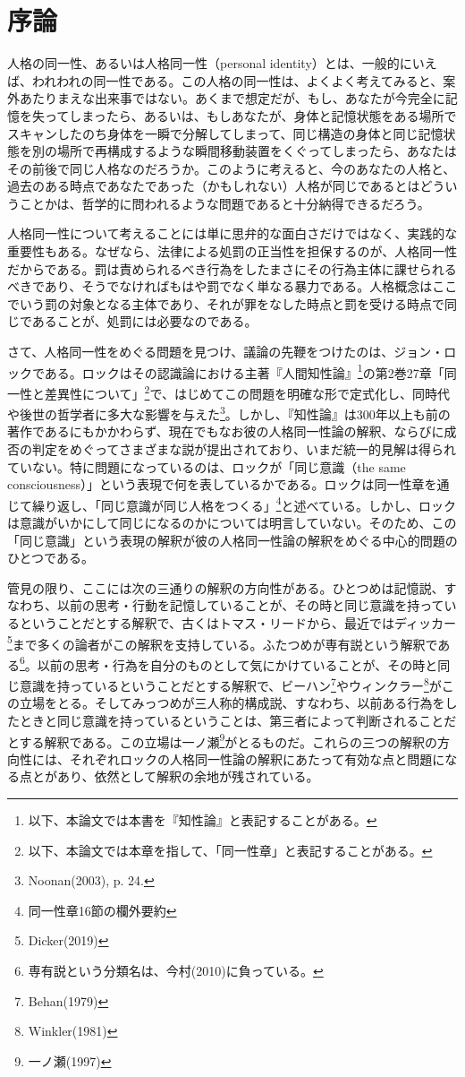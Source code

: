 \documentclass[a4j,oneside]{jsbook}
\begin{document}
\chapter*{
序論
}
人格の同一性、あるいは人格同一性（personal identity）とは、一般的にいえば、われわれの同一性である。この人格の同一性は、よくよく考えてみると、案外あたりまえな出来事ではない。あくまで想定だが、もし、あなたが今完全に記憶を失ってしまったら、あるいは、もしあなたが、身体と記憶状態をある場所でスキャンしたのち身体を一瞬で分解してしまって、同じ構造の身体と同じ記憶状態を別の場所で再構成するような瞬間移動装置をくぐってしまったら、あなたはその前後で同じ人格なのだろうか。このように考えると、今のあなたの人格と、過去のある時点であなたであった（かもしれない）人格が同じであるとはどういうことかは、哲学的に問われるような問題であると十分納得できるだろう。
\par
人格同一性について考えることには単に思弁的な面白さだけではなく、実践的な重要性もある。なぜなら、法律による処罰の正当性を担保するのが、人格同一性だからである。罰は責められるべき行為をしたまさにその行為主体に課せられるべきであり、そうでなければもはや罰でなく単なる暴力である。人格概念はここでいう罰の対象となる主体であり、それが罪をなした時点と罰を受ける時点で同じであることが、処罰には必要なのである。
\par
さて、人格同一性をめぐる問題を見つけ、議論の先鞭をつけたのは、ジョン・ロックである。ロックはその認識論における主著『人間知性論』\footnote{以下、本論文では本書を『知性論』と表記することがある。}の第2巻27章「同一性と差異性について」\footnote{以下、本論文では本章を指して、「同一性章」と表記することがある。}で、はじめてこの問題を明確な形で定式化し、同時代や後世の哲学者に多大な影響を与えた\footnote{Noonan(2003), p. 24.}。しかし、『知性論』は300年以上も前の著作であるにもかかわらず、現在でもなお彼の人格同一性論の解釈、ならびに成否の判定をめぐってさまざまな説が提出されており、いまだ統一的見解は得られていない。特に問題になっているのは、ロックが「同じ意識（the same consciousness）」という表現で何を表しているかである。ロックは同一性章を通じて繰り返し、「同じ意識が同じ人格をつくる」\footnote{同一性章16節の欄外要約}と述べている。しかし、ロックは意識がいかにして同じになるのかについては明言していない。そのため、この「同じ意識」という表現の解釈が彼の人格同一性論の解釈をめぐる中心的問題のひとつである。
\par
管見の限り、ここには次の三通りの解釈の方向性がある。ひとつめは記憶説、すなわち、以前の思考・行動を記憶していることが、その時と同じ意識を持っているということだとする解釈で、古くはトマス・リードから、最近ではディッカー\footnote{Dicker(2019)}まで多くの論者がこの解釈を支持している。ふたつめが専有説という解釈である\footnote{専有説という分類名は、今村(2010)に負っている。}。以前の思考・行為を自分のものとして気にかけていることが、その時と同じ意識を持っているということだとする解釈で、ビーハン\footnote{Behan(1979)}やウィンクラー\footnote{Winkler(1981)}がこの立場をとる。そしてみっつめが三人称的構成説、すなわち、以前ある行為をしたときと同じ意識を持っているということは、第三者によって判断されることだとする解釈である。この立場は一ノ瀬\footnote{一ノ瀬(1997)}がとるものだ。これらの三つの解釈の方向性には、それぞれロックの人格同一性論の解釈にあたって有効な点と問題になる点とがあり、依然として解釈の余地が残されている。
\end{document}
